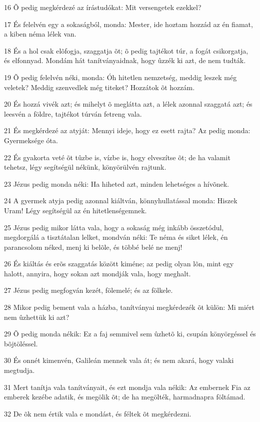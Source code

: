 \par 16 Õ pedig megkérdezé az írástudókat: Mit versengetek ezekkel?
\par 17 És felelvén egy a sokaságból, monda: Mester, ide hoztam hozzád az én fiamat, a kiben néma lélek van.
\par 18 És a hol csak elõfogja, szaggatja õt; õ pedig tajtékot túr, a fogát csikorgatja, és elfonnyad. Mondám hát tanítványaidnak, hogy ûzzék ki azt, de nem tudták.
\par 19 Õ pedig felelvén néki, monda: Óh hitetlen nemzetség, meddig leszek még veletek? Meddig szenvedlek még titeket? Hozzátok õt hozzám.
\par 20 És hozzá vivék azt; és mihelyt õ meglátta azt, a lélek azonnal szaggatá azt; és leesvén a földre, tajtékot túrván fetreng vala.
\par 21 És megkérdezé az atyját: Mennyi ideje, hogy ez esett rajta? Az pedig monda: Gyermeksége óta.
\par 22 És gyakorta veté õt tûzbe is, vízbe is, hogy elveszítse õt; de ha valamit tehetsz, légy segítségül nékünk, könyörülvén rajtunk.
\par 23 Jézus pedig monda néki: Ha hiheted azt, minden lehetséges a hívõnek.
\par 24 A gyermek atyja pedig azonnal kiáltván, könnyhullatással monda: Hiszek Uram! Légy segítségül az én hitetlenségemnek.
\par 25 Jézus pedig mikor látta vala, hogy a sokaság még inkább összetódul, megdorgálá a tisztátalan lelket, mondván néki: Te néma és siket lélek, én parancsolom néked, menj ki belõle, és többé belé ne menj!
\par 26 És kiáltás és erõs szaggatás között kiméne; az pedig olyan lõn, mint egy halott, annyira, hogy sokan azt mondják vala, hogy meghalt.
\par 27 Jézus pedig megfogván kezét, fölemelé; és az fölkele.
\par 28 Mikor pedig bement vala a házba, tanítványai megkérdezék õt külön: Mi miért nem ûzhettük ki azt?
\par 29 Õ pedig monda nékik: Ez a faj semmivel sem ûzhetõ ki, csupán könyörgéssel és bõjtöléssel.
\par 30 És onnét kimenvén, Galileán mennek vala át; és nem akará, hogy valaki megtudja.
\par 31 Mert tanítja vala tanítványait, és ezt mondja vala nékik: Az embernek Fia az emberek kezébe adatik, és megölik õt; de ha megölték, harmadnapra föltámad.
\par 32 De õk nem értik vala e mondást, és féltek õt megkérdezni.
